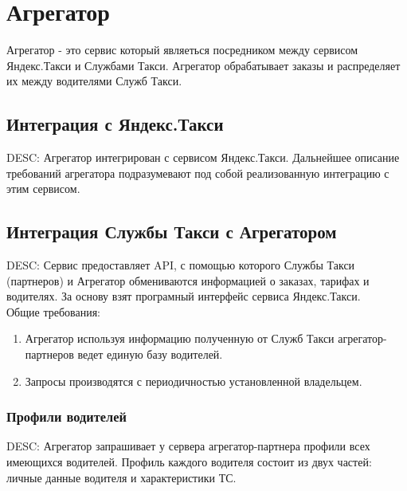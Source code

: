 \chapter{Агрегатор}

	Агрегатор - это сервис который являеться посредником между сервисом Яндекс.Такси и Службами Такси. Агрегатор обрабатывает заказы и распределяет их между водителями Служб Такси.

	\section{Интеграция с Яндекс.Такси}

		DESC: Агрегатор интегрирован с сервисом Яндекс.Такси. Дальнейшее описание требований агрегатора подразумевают под собой реализованную интеграцию с этим сервисом.  

	\section{Интеграция Службы Такси с Агрегатором}

		DESC: Сервис предоставляет API, с помощью которого Службы Такси (партнеров) и Агрегатор обмениваются информацией о заказах, тарифах и водителях. За основу взят програмный интерфейс сервиса Яндекс.Такси.\\

		Общие требования:
		\begin{enumerate}
			\item Агрегатор используя информацию полученную от Служб Такси агрегатор-партнеров ведет единую базу водителей.
			\item Запросы производятся с периодичностью установленной владельцем.
		\end{enumerate}

		\subsection{Профили водителей}

			DESC: Агрегатор запрашивает у сервера агрегатор-партнера профили всех имеющихся водителей. Профиль каждого водителя состоит из двух частей: личные данные водителя и характеристики ТС.

